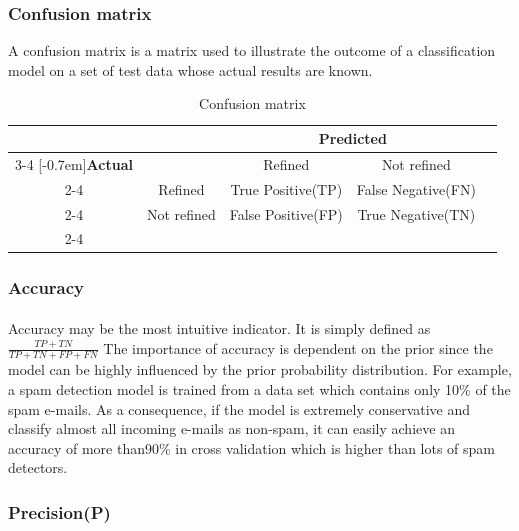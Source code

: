 \subsubsection{Confusion matrix}
A confusion matrix is a matrix used to illustrate the outcome of a classification model on a set of test data whose actual results are known.
    \begin{table}[]
        \centering
        \caption{Confusion matrix}
        \label{my-label}
        \begin{tabular}{ccccc}
                                & & \multicolumn{2}{c}{\textbf{Predicted}}                 &  \\ \cline{3-4}
                                \multirow{3}{*}[-0.7em]{\textbf{Actual}} &
                                & \multicolumn{1}{|c|}{Refined}        & \multicolumn{1}{c|}{Not refined}    &  \\ \cline{2-4}        
                                & \multicolumn{1}{|c}{Refined}     & \multicolumn{1}{|c|}{True Positive(TP)}  & \multicolumn{1}{c|}{False Negative(FN)} &  \\ \cline{2-4}
                                & \multicolumn{1}{|c}{Not refined} & \multicolumn{1}{|c|}{False Positive(FP)} & \multicolumn{1}{c|}{True Negative(TN)}  &  \\ \cline{2-4}
        \end{tabular}
    \end{table}
\subsubsection{Accuracy}
\paragraph{}
Accuracy may be the most intuitive indicator.
It is simply defined as $\frac{TP+TN}{TP+TN+FP+FN}$
The importance of accuracy is dependent on the prior since the model can be highly influenced by the prior probability distribution.
For example, a spam detection model is trained from a data set which contains only 10\% of the spam e-mails.
As a consequence, if the model is extremely conservative and classify almost all incoming e-mails as non-spam, it can easily achieve an accuracy of more than90\% in cross validation which is higher than lots of spam detectors.

\subsubsection{Precision(P)}

